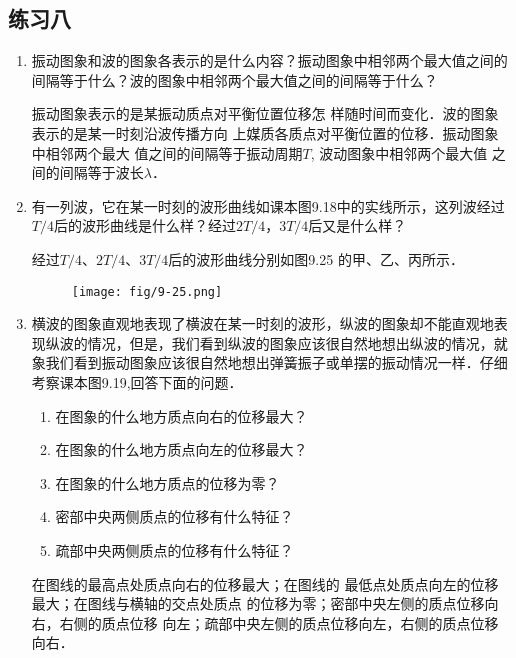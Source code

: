 \subsection{练习八}
\begin{enumerate}
    \item 振动图象和波的图象各表示的是什么内容？振动图象中相邻两个最大值之间的间隔等于什么？波的图象中相邻两个最大值之间的间隔等于什么？

    \begin{solution}
        振动图象表示的是某振动质点对平衡位置位移怎
        样随时间而变化．波的图象表示的是某一时刻沿波传播方向
        上媒质各质点对平衡位置的位移．振动图象中相邻两个最大
        值之间的间隔等于振动周期$T$, 波动图象中相邻两个最大值
        之间的间隔等于波长$\lambda$．
    \end{solution}
    \item 有一列波，它在某一时刻的波形曲线如课本图9.18中的实线所示，这列波经过$T/4$后的波形曲线是什么样？经过$2T/4$，$3T/4$后又是什么样？

    \begin{solution}
        经过$T/4$、$2T/4$、$3T/4$后的波形曲线分别如图9.25
        的甲、乙、丙所示．
\begin{figure}[htp]
    \centering
    \texttt{[image: fig/9-25.png]}
    \caption{}
\end{figure}

    \end{solution}
    \item 横波的图象直观地表现了横波在某一时刻的波形，纵波的图象却不能直观地表现纵波的情况，但是，我们看到纵波的图象应该很自然地想出纵波的情况，就象我们看到振动图象应该很自然地想出弹簧振子或单摆的振动情况一样．仔细考察课本图9.19,回答下面的问题．
    \begin{enumerate}
        \item 在图象的什么地方质点向右的位移最大？
        \item 在图象的什么地方质点向左的位移最大？
        \item 在图象的什么地方质点的位移为零？
        \item 密部中央两侧质点的位移有什么特征？
        \item 疏部中央两侧质点的位移有什么特征？
    \end{enumerate}

    \begin{solution}
    在图线的最高点处质点向右的位移最大；在图线的
最低点处质点向左的位移最大；在图线与横轴的交点处质点
的位移为零；密部中央左侧的质点位移向右，右侧的质点位移
向左；疏部中央左侧的质点位移向左，右侧的质点位移向右．
    \end{solution}
\end{enumerate}




